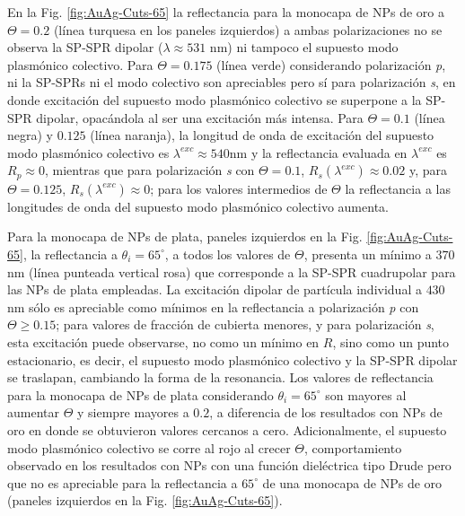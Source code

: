 En la Fig. \ref{fig:AuAg-Cuts-65} la reflectancia  para la monocapa de NPs de oro a $\Theta=0.2$  (línea turquesa en los paneles izquierdos) a ambas polarizaciones no se observa la SP-SPR dipolar ($\lambda\approx531$ nm) ni tampoco el supuesto modo plasmónico colectivo. Para $\Theta=0.175$ (línea verde) considerando polarización \emph{p}, ni la SP-SPRs ni el modo colectivo son apreciables pero sí para polarización \emph{s}, en donde excitación del supuesto modo plasmónico colectivo se superpone a la SP-SPR dipolar, opacándola al ser una excitación más intensa. Para $\Theta= 0.1$ (línea negra)  y $0.125$ (línea naranja), la longitud de onda de excitación del supuesto modo plasmónico colectivo es $\lambda^{exc} \approx 540\text {nm}$ y la reflectancia evaluada en $\lambda^{exc}$ es $R_p\approx 0$, mientras que  para polarización \emph{s} con $\Theta=0.1$,  $R_s(\lambda^{exc}) \approx0.02$ y, para $\Theta=0.125$, $R_s(\lambda^{exc})\approx 0$; para los valores intermedios de $\Theta$ la reflectancia a las longitudes de onda del supuesto modo plasmónico colectivo aumenta.

Para la monocapa de NPs de plata, paneles izquierdos en la Fig. \ref{fig:AuAg-Cuts-65}, la reflectancia a $\theta_i=65^\circ$, a todos los valores de $\Theta$, presenta un mínimo a $370$ nm (línea punteada vertical rosa) que corresponde a la SP-SPR cuadrupolar para las NPs de plata empleadas. La excitación dipolar de partícula individual a $430$ nm sólo es apreciable como mínimos en la reflectancia a polarización \emph{p} con $\Theta \geq 0.15$; para valores de fracción de cubierta menores, y para polarización \emph{s}, esta excitación puede observarse, no como un mínimo en $R$, sino como un punto estacionario, es decir, el supuesto modo plasmónico colectivo y la SP-SPR dipolar se traslapan, cambiando la forma de la resonancia. Los valores de reflectancia para la monocapa de NPs de plata considerando $\theta_i=65^\circ$ son mayores al aumentar $\Theta$ y siempre mayores a $0.2$, a diferencia de los resultados con NPs de oro en donde se obtuvieron valores cercanos a cero. Adicionalmente, el supuesto modo plasmónico colectivo se corre al rojo al crecer $\Theta$, comportamiento observado en los resultados con NPs con una función dieléctrica tipo Drude pero que no es apreciable para la reflectancia  a  $65^\circ$ de una monocapa de NPs de oro (paneles izquierdos en la Fig. \ref{fig:AuAg-Cuts-65}).
	
